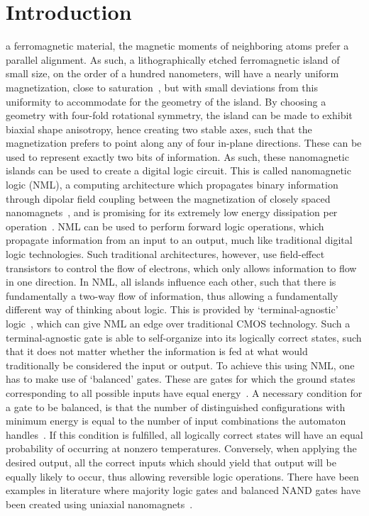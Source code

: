 \documentclass[twocolumn]{phdsymp}
\begin{document}
\section{Introduction}
 a ferromagnetic material, the magnetic moments of neighboring atoms prefer a parallel alignment. As such, a lithographically etched ferromagnetic island of small size, on the order of a hundred nanometers, will have a nearly uniform magnetization, close to saturation~\cite{NML_Carlton,MQCA_RoomTemp}, but with small deviations from this uniformity to accommodate for the geometry of the island. By choosing a geometry with four-fold rotational symmetry, the island can be made to exhibit biaxial shape anisotropy, hence creating two stable axes, such that the magnetization prefers to point along any of four in-plane directions. These can be used to represent exactly two bits of information. As such, these nanomagnetic islands can be used to create a digital logic circuit. This is called nanomagnetic logic (NML), a computing architecture which propagates binary information through dipolar field coupling between the magnetization of closely spaced nanomagnets~\cite{SubnanosecondPropagation_AnisotropyChains}, and is promising for its extremely low energy dissipation per operation~\cite{SubnanosecondPropagation_AnisotropyChains,FourStateLogic,MQCA_RoomTemp}. NML can be used to perform forward logic operations, which propagate information from an input to an output, much like traditional digital logic technologies. Such traditional architectures, however, use field-effect transistors to control the flow of electrons, which only allows information to flow in one direction. In NML, all islands influence each other, such that there is fundamentally a two-way flow of information, thus allowing a fundamentally different way of thinking about logic. This is provided by `terminal-agnostic' logic~\cite{FactorizationMemcomputing}, which can give NML an edge over traditional CMOS technology. Such a terminal-agnostic gate is able to self-organize into its logically correct states, such that it does not matter whether the information is fed at what would traditionally be considered the input or output. To achieve this using NML, one has to make use of `balanced' gates. These are gates for which the ground states corresponding to all possible inputs have equal energy~\cite{GYP-18}. A necessary condition for a gate to be balanced, is that the number of distinguished configurations with minimum energy is equal to the number of input combinations the automaton handles~\cite{QCA_Algorithms}. If this condition is fulfilled, all logically correct states will have an equal probability of occurring at nonzero temperatures. Conversely, when applying the desired output, all the correct inputs which should yield that output will be equally likely to occur, thus allowing reversible logic operations. There have been examples in literature where majority logic gates and balanced NAND gates have been created using uniaxial nanomagnets~\cite{GYP-18}. \par
\end{document}
